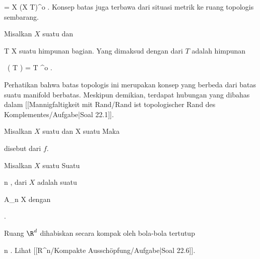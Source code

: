 \mavergleichskettedisp
{\vergleichskette
{ 
}
{ =} { X \setminus (X \setminus T)^{o}
}
{ } {
}
{ } {
}
{ } {
}
}
{}{}{.}
Konsep batas juga terbawa dari situasi metrik ke ruang topologis sembarang.

{
}
{

Misalkan $X$ suatu
dan

\mavergleichskette
{\vergleichskette
{ T
}
{ \subseteq }{ X
}
{  }{
}
{    }{
}
{   }{
}
}
{}{}{}
suatu himpunan bagian. Yang dimaksud dengan
dari $T$ adalah himpunan

\mavergleichskettedisp
{\vergleichskette
{  \, ( T )
}
{ =} {   \setminus T ^{o}
}
{ } {
}
{ } {
}
{ } {
}
}
{}{}{.}

}
Perhatikan bahwa batas topologis ini merupakan konsep yang berbeda dari batas suatu manifold berbatas. Meskipun demikian, terdapat hubungan yang dibahas dalam
[[Mannigfaltigkeit mit Rand/Rand ist topologischer Rand des Komplementes/Aufgabe|Soal 22.1]].

{}
{

Misalkan $X$ suatu
dan
 { X } {\R
} {}
suatu
Maka

 {  }

disebut  dari $f$.

}

{}
{

Misalkan $X$ suatu
Suatu 

 {}
 {n \in \N} {}
 {} {} {} {,}
dari $X$ adalah suatu

\mavergleichskette
{\vergleichskette
{ A_n
}
{ \subseteq }{ X
}
{  }{
}
{    }{
}
{   }{
}
}
{}{}{}
dengan

 { . }

}

Ruang $\R^d$ dihabiskan secara kompak oleh bola-bola tertutup

 {}
 {n \in \N} {}
 {} {} {} {.}
Lihat
[[R^n/Kompakte Ausschöpfung/Aufgabe|Soal 22.6]].

